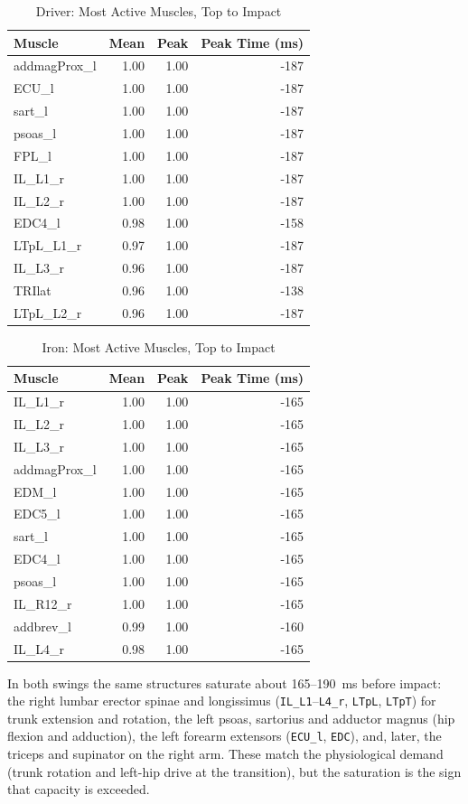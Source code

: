 \documentclass[11pt,a4paper]{article}
\begin{document}
\begin{table}[h]\centering\small
\caption{Driver: Most Active Muscles, Top to Impact}
\begin{tabular}{lrrr}\toprule Muscle & Mean & Peak & Peak Time (ms) \\\midrule
addmagProx\_l & 1.00 & 1.00 & -187 \\
ECU\_l & 1.00 & 1.00 & -187 \\
sart\_l & 1.00 & 1.00 & -187 \\
psoas\_l & 1.00 & 1.00 & -187 \\
FPL\_l & 1.00 & 1.00 & -187 \\
IL\_L1\_r & 1.00 & 1.00 & -187 \\
IL\_L2\_r & 1.00 & 1.00 & -187 \\
EDC4\_l & 0.98 & 1.00 & -158 \\
LTpL\_L1\_r & 0.97 & 1.00 & -187 \\
IL\_L3\_r & 0.96 & 1.00 & -187 \\
TRIlat & 0.96 & 1.00 & -138 \\
LTpL\_L2\_r & 0.96 & 1.00 & -187 \\
\bottomrule\end{tabular}\end{table}

\begin{table}[h]\centering\small
\caption{Iron: Most Active Muscles, Top to Impact}
\begin{tabular}{lrrr}\toprule Muscle & Mean & Peak & Peak Time (ms) \\\midrule
IL\_L1\_r & 1.00 & 1.00 & -165 \\
IL\_L2\_r & 1.00 & 1.00 & -165 \\
IL\_L3\_r & 1.00 & 1.00 & -165 \\
addmagProx\_l & 1.00 & 1.00 & -165 \\
EDM\_l & 1.00 & 1.00 & -165 \\
EDC5\_l & 1.00 & 1.00 & -165 \\
sart\_l & 1.00 & 1.00 & -165 \\
EDC4\_l & 1.00 & 1.00 & -165 \\
psoas\_l & 1.00 & 1.00 & -165 \\
IL\_R12\_r & 1.00 & 1.00 & -165 \\
addbrev\_l & 0.99 & 1.00 & -160 \\
IL\_L4\_r & 0.98 & 1.00 & -165 \\
\bottomrule\end{tabular}\end{table}
\noindent In both swings the same structures saturate about 165--190~ms before impact: the right lumbar erector spinae and longissimus (\texttt{IL\_L1}--\texttt{L4\_r}, \texttt{LTpL}, \texttt{LTpT}) for trunk extension and rotation, the left psoas, sartorius and adductor magnus (hip flexion and adduction), the left forearm extensors (\texttt{ECU\_l}, \texttt{EDC}), and, later, the triceps and supinator on the right arm. These match the physiological demand (trunk rotation and left-hip drive at the transition), but the saturation is the sign that capacity is exceeded.
\end{document}
